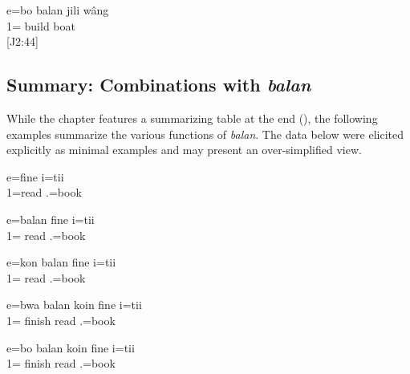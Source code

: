%	
%	
	
	\ea\label{ex:bobalan3}
	\gll 	e=bo balan jili wâng	\\
		1=  build boat	\\
	\glt	{} {[J2:44]}
	\z



 
\subsection{Summary: Combinations with \textit{balan}}
 While the chapter features a summarizing table at the end (), %
the following examples summarize the various functions of \textit{balan}. The data below were elicited explicitly as minimal examples and may present an over-simplified view. %
 
 \ea
 \gll 	e=fine i=tii	\\
 	1=read .=book	\\
 \glt	{}
 \z
 
 \ea
 \gll 	e=balan fine i=tii	\\
 	1= read .=book	\\
 \glt {}	%
 \z
 
 \ea
 \gll 	e=kon balan fine i=tii	\\
 	1=  read .=book	\\
 \glt	{}%
 \z
 
 \ea
 \gll 	e=bwa balan koin fine i=tii	\\
 	1=  finish read .=book	\\
 \glt	{}%
 \z

 \ea
 \gll e=bo balan koin fine i=tii\\ 
  1=  finish read .=book	\\
 \glt {}
% 
% 
 \z
 
